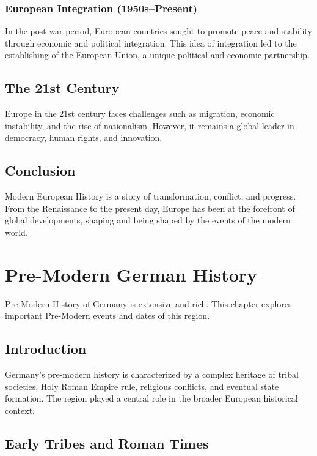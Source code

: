 \documentclass{book}
\begin{document}
\subsection{European Integration (1950s–Present)}
In the post-war period, European countries sought to promote peace and stability through economic and political integration. This idea of integration led to the establishing of the European Union, a unique political and economic partnership.

\section{The 21st Century}
\label{sec:21st-century-europe}
Europe in the 21st century faces challenges such as migration, economic instability, and the rise of nationalism. However, it remains a global leader in democracy, human rights, and innovation.

\section{Conclusion}
\label{sec:conclusion-modern-europe}
Modern European History is a story of transformation, conflict, and progress. From the Renaissance to the present day, Europe has been at the forefront of global developments, shaping and being shaped by the events of the modern world.

\chapter{Pre-Modern German History}
\label{ch:pre-modern-german-history}

Pre-Modern History of Germany is extensive and rich. This chapter explores important Pre-Modern events and dates of this region.

\section{Introduction}
\label{sec:introduction-pre-modern-germany}
Germany’s pre-modern history is characterized by a complex heritage of tribal societies, Holy Roman Empire rule, religious conflicts, and eventual state formation. The region played a central role in the broader European historical context.

\section{Early Tribes and Roman Times}
\label{sec:early-tribes-roman-times}
\end{document}
